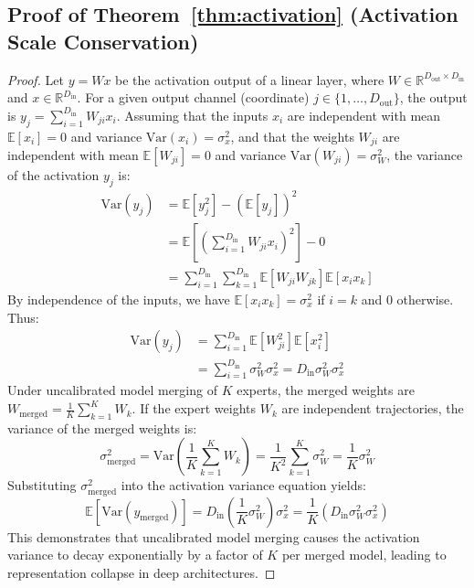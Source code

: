 \documentclass{article}
\theoremstyle{plain}
\theoremstyle{definition}
\theoremstyle{remark}
\begin{document}
\subsection{Proof of Theorem~\ref{thm:activation} (Activation Scale Conservation)}
\label{app:proof_activation}
\begin{proof}
  Let $y = W x$ be the activation output of a linear layer, where $W \in \mathbb{R}^{D_{\mathrm{out}} \times D_{\mathrm{in}}}$ and $x \in \mathbb{R}^{D_{\mathrm{in}}}$. 
  For a given output channel (coordinate) $j \in \{1, \dots, D_{\mathrm{out}}\}$, the output is $y_j = \sum_{i=1}^{D_{\mathrm{in}}} W_{ji} x_i$.
  Assuming that the inputs $x_i$ are independent with mean $\mathbb{E}[x_i] = 0$ and variance $\mathrm{Var}(x_i) = \sigma_x^2$, and that the weights $W_{ji}$ are independent with mean $\mathbb{E}[W_{ji}] = 0$ and variance $\mathrm{Var}(W_{ji}) = \sigma^2_W$, the variance of the activation $y_j$ is:
  \begin{align}
    \mathrm{Var}(y_j) &= \mathbb{E}[y_j^2] - (\mathbb{E}[y_j])^2 \nonumber \\
    &= \mathbb{E}\left[ \left( \sum_{i=1}^{D_{\mathrm{in}}} W_{ji} x_i \right)^2 \right] - 0 \nonumber \\
    &= \sum_{i=1}^{D_{\mathrm{in}}} \sum_{k=1}^{D_{\mathrm{in}}} \mathbb{E}[W_{ji} W_{jk}] \mathbb{E}[x_i x_k]
  \end{align}
  By independence of the inputs, we have $\mathbb{E}[x_i x_k] = \sigma_x^2$ if $i = k$ and $0$ otherwise. Thus:
  \begin{align}
    \mathrm{Var}(y_j) &= \sum_{i=1}^{D_{\mathrm{in}}} \mathbb{E}[W_{ji}^2] \mathbb{E}[x_i^2] \nonumber \\
    &= \sum_{i=1}^{D_{\mathrm{in}}} \sigma^2_W \sigma^2_x = D_{\mathrm{in}} \sigma^2_W \sigma^2_x
  \end{align}
  Under uncalibrated model merging of $K$ experts, the merged weights are $W_{\mathrm{merged}} = \frac{1}{K}\sum_{k=1}^K W_k$. If the expert weights $W_k$ are independent trajectories, the variance of the merged weights is:
  \begin{equation}
    \sigma_{\mathrm{merged}}^2 = \mathrm{Var}\left( \frac{1}{K}\sum_{k=1}^K W_k \right) = \frac{1}{K^2} \sum_{k=1}^K \sigma^2_W = \frac{1}{K} \sigma^2_W
  \end{equation}
  Substituting $\sigma_{\mathrm{merged}}^2$ into the activation variance equation yields:
  \begin{equation}
    \mathbb{E}[\mathrm{Var}(y_{\mathrm{merged}})] = D_{\mathrm{in}} \left( \frac{1}{K} \sigma^2_W \right) \sigma^2_x = \frac{1}{K} \left( D_{\mathrm{in}} \sigma^2_W \sigma^2_x \right)
  \end{equation}
  This demonstrates that uncalibrated model merging causes the activation variance to decay exponentially by a factor of $K$ per merged model, leading to representation collapse in deep architectures.
  

\end{proof}
\end{document}
